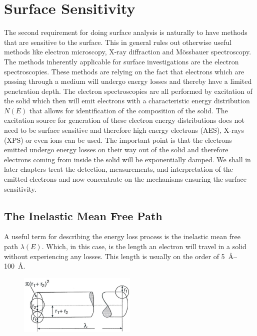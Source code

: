 \section{Surface Sensitivity}
The second requirement for doing surface analysis is naturally to have methods that are sensitive to the surface. This in general rules out otherwise useful methods like electron microscopy, X-ray diffraction and M\"{o}ssbauer spectroscopy. The methods inherently applicable for surface investigations are the electron spectroscopies. These methods are relying on the fact that electrons which are passing through a medium will undergo energy losses and thereby have a limited penetration depth. The electron spectroscopies are all performed by excitation of the solid which then will emit electrons with a characteristic energy distribution $N(E)$ that allows for identification of the composition of the solid. The excitation source for generation of these electron energy distributions does not need to be surface sensitive and therefore high energy electrons (AES), X-rays (XPS) or even ions can be used. The important point is that the electrons emitted undergo energy losses on their way out of the solid and therefore electrons coming from inside the solid will be exponentially damped. We shall in later chapters treat the detection, measurements, and interpretation of the emitted electrons and now concentrate on the mechanisms ensuring the surface sensitivity.

\subsection{The Inelastic Mean Free Path}
A useful term for describing the energy loss process is the inelastic mean free path $\lambda (E)$. Which, in this case, is the length an electron will travel in a solid without experiencing any losses. This length is usually on the order of \SIrange{5}{100}{\angstrom}.

\begin{figure}[htbp]
\centering
\includegraphics[width=0.5\textwidth]{figures/02_05}
\caption{ }
\label{fig:sphere_model}
\end{figure}

